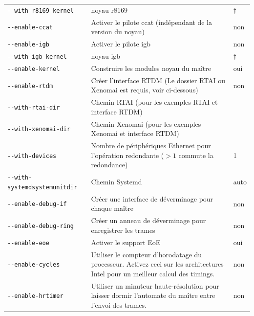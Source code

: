 \documentclass[a4paper,12pt,BCOR=6mm,bibtotoc,idxtotoc]{scrbook}
\begin{document}
\begin{longtable}{l|p{}|l}
\lstinline+--with-r8169-kernel+ & noyau r8169 & $\dagger$\\

\lstinline+--enable-ccat+ & Activer le pilote ccat (ind\'ependant de
la version du noyau) & non\\

\lstinline+--enable-igb+ & Activer le pilote igb & non\\

\lstinline+--with-igb-kernel+ & noyau igb & $\dagger$\\

\hline

\lstinline+--enable-kernel+ & Construire les modules noyau du ma\^itre
& oui\\

\lstinline+--enable-rtdm+ & Cr\'eer l'interface RTDM (Le dossier RTAI
ou Xenomai est requis, voir ci-dessous) & non\\

\lstinline+--with-rtai-dir+ & Chemin RTAI (pour les exemples RTAI et
interface RTDM) & \\

\lstinline+--with-xenomai-dir+ & Chemin Xenomai (pour les exemples
Xenomai et interface RTDM) & \\

\lstinline+--with-devices+ & Nombre de p\'eriph\'eriques Ethernet pour
l'op\'eration redondante ($>1$ commute la redondance) & 1\\

\lstinline+--with-systemdsystemunitdir+ & Chemin Systemd & auto \\

\lstinline+--enable-debug-if+ & Cr\'eer une interface de d\'everminage pour
chaque ma\^itre & non\\

\lstinline+--enable-debug-ring+ & Cr\'eer un anneau de d\'everminage pour
enregistrer les trames & non\\

\lstinline+--enable-eoe+ & Activer le support EoE & oui\\

\lstinline+--enable-cycles+ & Utiliser le compteur d'horodatage du
processeur. Activez ceci sur les architectures Intel pour un meilleur
calcul des timings. & non\\

\lstinline+--enable-hrtimer+ & Utiliser un minuteur haute-r\'esolution
pour laisser dormir l'automate du ma\^itre entre l'envoi des trames. &
non\\


\end{longtable}
\end{document}
